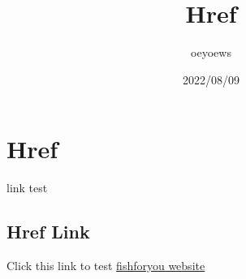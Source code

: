 \documentclass{article}
\title{Href}
\author{oeyoews}
\date{2022/08/09}
\begin{document}
\maketitle

\newpage

\section*{Href}

link test

\subsection{Href Link}%

Click this link to test
\href{https://oeyoew.fun}{fishforyou website}
\end{document}

